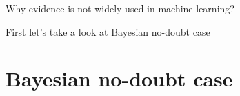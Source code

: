 \documentclass[shownotes]{beamer}
\begin{document}
% 
% 
% 
% 
% 


\begin{frame}
 
 \vspace{1cm}
 
 \begin{center}
  \huge
  Why evidence is not widely used in machine learning?
 \end{center}

 \vspace{1cm}
\pause
 
 \begin{framed}
  \centering \large First let's take a look at Bayesian no-doubt case
 \end{framed}

  
 
 
\end{frame}



\section{Bayesian no-doubt case}
\end{document}
